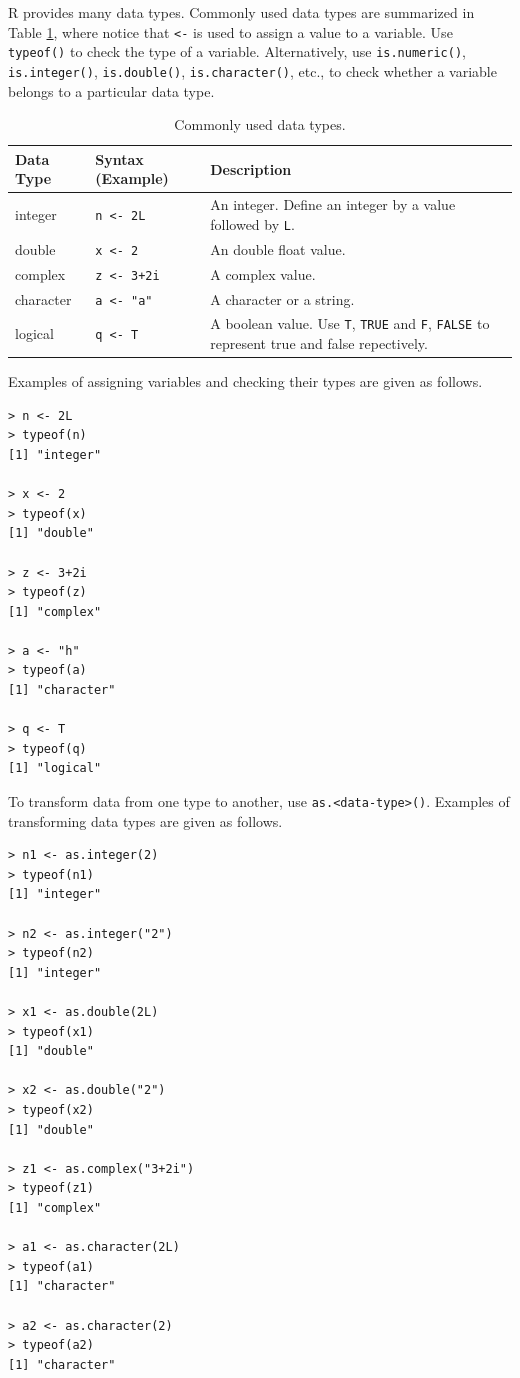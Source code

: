 R provides many data types. Commonly used data types are summarized in Table \ref{ch:r1:tab:datatype}, where notice that \verb|<-| is used to assign a value to a variable. Use \verb|typeof()| to check the type of a variable. Alternatively, use \verb|is.numeric()|, \verb|is.integer()|, \verb|is.double()|, \verb|is.character()|, etc., to check whether a variable belongs to a particular data type.
\begin{table}
  \centering \caption{Commonly used data types.}\label{ch:r1:tab:datatype}
  \begin{tabularx}{\textwidth}{llX}
    \hline
    Data Type & Syntax (Example) & Description \\ \hline
    integer & \verb|n <- 2L| & An integer. Define an integer by a value followed by \verb|L|. \\
    double & \verb|x <- 2| & An double float value. \\
    complex & \verb|z <- 3+2i| & A complex value. \\
    character & \verb|a <- "a"| & A character or a string. \\
    logical & \verb|q <- T| & A boolean value. Use \verb|T|, \verb|TRUE| and \verb|F|, \verb|FALSE| to represent true and false repectively. \\
    \hline
  \end{tabularx}
\end{table}

Examples of assigning variables and checking their types are given as follows.
\begin{lstlisting}
> n <- 2L
> typeof(n)
[1] "integer"

> x <- 2
> typeof(x)
[1] "double"

> z <- 3+2i
> typeof(z)
[1] "complex"

> a <- "h"
> typeof(a)
[1] "character"

> q <- T
> typeof(q)
[1] "logical"
\end{lstlisting}

To transform data from one type to another, use \verb|as.<data-type>()|. Examples of transforming data types are given as follows.
\begin{lstlisting}
> n1 <- as.integer(2)
> typeof(n1)
[1] "integer"

> n2 <- as.integer("2")
> typeof(n2)
[1] "integer"

> x1 <- as.double(2L)
> typeof(x1)
[1] "double"

> x2 <- as.double("2")
> typeof(x2)
[1] "double"

> z1 <- as.complex("3+2i")
> typeof(z1)
[1] "complex"

> a1 <- as.character(2L)
> typeof(a1)
[1] "character"

> a2 <- as.character(2)
> typeof(a2)
[1] "character"
\end{lstlisting}

